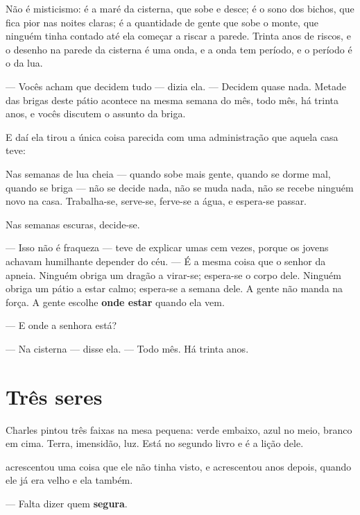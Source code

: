 \documentclass[livro.tex]{subfiles}
\begin{document}
Não é misticismo: é a maré da cisterna, que sobe e desce; é o sono dos bichos, que fica pior nas
noites claras; é a quantidade de gente que sobe o monte, que ninguém tinha contado até ela
começar a riscar a parede. Trinta anos de riscos, e o desenho na parede da cisterna é uma onda,
e a onda tem período, e o período é o da lua.

--- Vocês acham que decidem tudo --- dizia ela. --- Decidem quase nada. Metade das brigas deste
pátio acontece na mesma semana do mês, todo mês, há trinta anos, e vocês discutem o assunto da
briga.

\medskip

E daí ela tirou a única coisa parecida com uma administração que aquela casa teve:

Nas semanas de lua cheia --- quando sobe mais gente, quando se dorme mal, quando se briga ---
não se decide nada, não se muda nada, não se recebe ninguém novo na casa. Trabalha-se, serve-se,
ferve-se a água, e espera-se passar.

Nas semanas escuras, decide-se.

\medskip

--- Isso não é fraqueza --- teve de explicar umas cem vezes, porque os jovens achavam humilhante
depender do céu. --- É a mesma coisa que o senhor da apneia. Ninguém obriga um dragão a virar-se;
espera-se o corpo dele. Ninguém obriga um pátio a estar calmo; espera-se a semana dele. A gente
não manda na força. A gente escolhe \textbf{onde estar} quando ela vem.

--- E onde a senhora está?

--- Na cisterna --- disse ela. --- Todo mês. Há trinta anos.

\section{Três seres}

Charles pintou três faixas na mesa pequena: verde embaixo, azul no meio, branco em cima. Terra,
imensidão, luz. Está no segundo livro e é a lição dele.

\Lua acrescentou uma coisa que ele não tinha visto, e acrescentou anos depois, quando ele já era
velho e ela também.

\medskip

--- Falta dizer quem \textbf{segura}.
\end{document}

